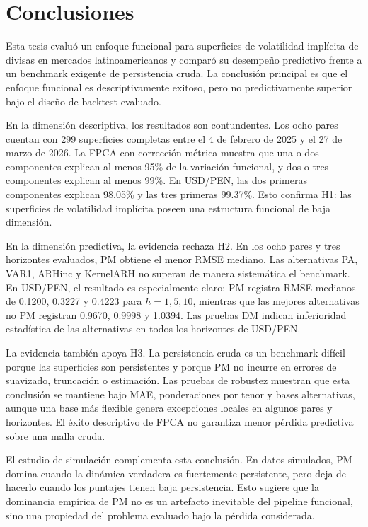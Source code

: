 \documentclass[a4paper,11pt]{article}
\newcommand{\SVIs}{superficies de volatilidad implícita}
\begin{document}
\section{Conclusiones}

Esta tesis evaluó un enfoque funcional para \SVIs{} de divisas en mercados latinoamericanos y comparó su desempeño predictivo frente a un benchmark exigente de persistencia cruda. La conclusión principal es que el enfoque funcional es descriptivamente exitoso, pero no predictivamente superior bajo el diseño de backtest evaluado.

En la dimensión descriptiva, los resultados son contundentes. Los ocho pares cuentan con 299 superficies completas entre el 4 de febrero de 2025 y el 27 de marzo de 2026. La FPCA con corrección métrica muestra que una o dos componentes explican al menos 95\% de la variación funcional, y dos o tres componentes explican al menos 99\%. En USD/PEN, las dos primeras componentes explican 98.05\% y las tres primeras 99.37\%. Esto confirma H1: las \SVIs{} poseen una estructura funcional de baja dimensión.

En la dimensión predictiva, la evidencia rechaza H2. En los ocho pares y tres horizontes evaluados, PM obtiene el menor RMSE mediano. Las alternativas PA, VAR1, ARHinc y KernelARH no superan de manera sistemática el benchmark. En USD/PEN, el resultado es especialmente claro: PM registra RMSE medianos de 0.1200, 0.3227 y 0.4223 para \(h=1,5,10\), mientras que las mejores alternativas no PM registran 0.9670, 0.9998 y 1.0394. Las pruebas DM indican inferioridad estadística de las alternativas en todos los horizontes de USD/PEN.

La evidencia también apoya H3. La persistencia cruda es un benchmark difícil porque las superficies son persistentes y porque PM no incurre en errores de suavizado, truncación o estimación. Las pruebas de robustez muestran que esta conclusión se mantiene bajo MAE, ponderaciones por tenor y bases alternativas, aunque una base más flexible genera excepciones locales en algunos pares y horizontes. El éxito descriptivo de FPCA no garantiza menor pérdida predictiva sobre una malla cruda.

El estudio de simulación complementa esta conclusión. En datos simulados, PM domina cuando la dinámica verdadera es fuertemente persistente, pero deja de hacerlo cuando los puntajes tienen baja persistencia. Esto sugiere que la dominancia empírica de PM no es un artefacto inevitable del pipeline funcional, sino una propiedad del problema evaluado bajo la pérdida considerada.
\end{document}
